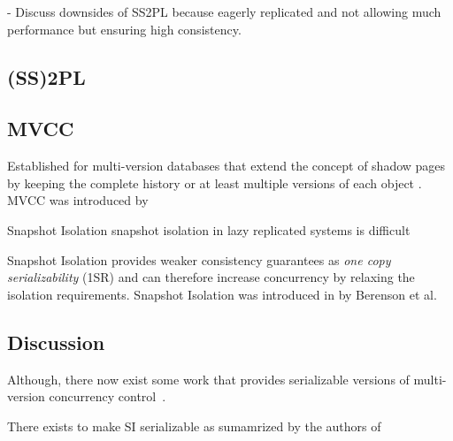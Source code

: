 - Discuss downsides of SS2PL because eagerly  replicated and not allowing much performance but ensuring high consistency.

\subsection{(SS)2PL}
\subsection{MVCC}
Established for multi-version databases that extend the concept of shadow pages by keeping the complete history or at least multiple versions of each object \cite{bernstein:1982}.
MVCC was introduced by \cite{bernstein:1983}

Snapshot Isolation \cite{daudjee:2006} snapshot isolation in lazy replicated systems is difficult

Snapshot Isolation provides weaker consistency guarantees as \emph{one copy serializability} (1SR) and can therefore increase concurrency by relaxing the isolation requirements.
Snapshot Isolation was introduced in by Berenson et al. ~\cite{berenson:1995}

\subsection{Discussion}
Although, there now exist some work that provides serializable versions of multi-version concurrency control~\cite{faleiro:2015}.

There exists  to make SI serializable as sumamrized by the authors of ~\cite{fekete:2005}

